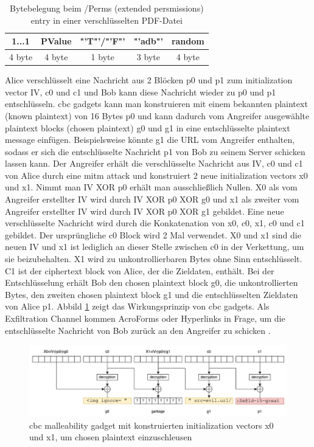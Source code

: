 \begin{table}[ht]
	\centering
	\begin{tabular}{c c c c c}
	\hline
	\textbf{1...1}	& \textbf{PValue} 	& \textbf{"'T"'/"'F"'} 	& \textbf{"'adb"'} 	& \textbf{random} 	\\ 
	\hline
	4 byte 			& 4 byte 			& 1 byte  			& 3 byte 			& 4 byte 			\\ 
	\hline
	\end{tabular}
	\caption{Bytebelegung beim /Perms (extended persmissions) entry in einer verschlüsselten PDF-Datei \cite{ccc-break-pdf}}
	\label{table:perms}
\end{table}

Alice verschlüsselt eine Nachricht aus 2 Blöcken p0 und p1 zum initialization vector IV, c0 und c1 und Bob kann diese Nachricht wieder zu p0 und p1 entschlüsseln. \gls{cbc} gadgets kann man konstruieren mit einem bekannten plaintext (known plaintext) von 16 Bytes p0 und kann dadurch vom Angreifer ausgewählte plaintext blocks (chosen plaintext) g0 und g1 in eine entschlüsselte plaintext message einfügen. Beispielsweise könnte g1 die URL vom Angreifer enthalten, sodass er sich die entschlüsselte Nachricht p1 von Bob zu seinem Server schicken lassen kann. Der Angreifer erhält die verschlüsselte Nachricht aus IV, c0 und c1 von Alice durch eine \gls{mitm} attack und konstruiert 2 neue initialization vectors x0 und x1. Nimmt man IV XOR p0 erhält man ausschließlich Nullen. X0 als vom Angreifer erstellter IV wird durch IV XOR p0 XOR g0 und x1 als zweiter vom Angreifer erstellter IV wird durch IV XOR p0 XOR g1 gebildet. Eine neue verschlüsselte Nachricht wird durch die Konkatenation von x0, c0, x1, c0 und c1 gebildet. Der ursprüngliche c0 Block wird 2 Mal verwendet. X0 und x1 sind die neuen IV und x1 ist lediglich an dieser Stelle zwischen c0 in der Verkettung, um sie beizubehalten. X1 wird zu unkontrollierbaren Bytes ohne Sinn entschlüsselt. C1 ist der ciphertext block von Alice, der die Zieldaten, enthält. Bei der Entschlüsselung erhält Bob den chosen plaintext block g0, die unkontrollierten Bytes, den zweiten chosen plaintext block g1 und die entschlüsselten Zieldaten von Alice p1. Abbild \ref{fig:gadget} zeigt das Wirkungsprinzip von \gls{cbc} gadgets. Als Exfiltration Channel kommen AcroForms oder Hyperlinks in Frage, um die entschlüsselte Nachricht von Bob zurück an den Angreifer zu schicken \cite{gadget, ccc-break-pdf, crypto-web}.
\par

\begin{figure}[!htbp]
	\centering
	\includegraphics[width=1\textwidth]{"images/gadget2-gadget.png"}
	\caption{\gls{cbc} malleability gadget mit konstruierten initialization vectors x0 und x1, um chosen plaintext einzuschleusen \cite{gadget}}
	\label{fig:gadget}
\end{figure}

